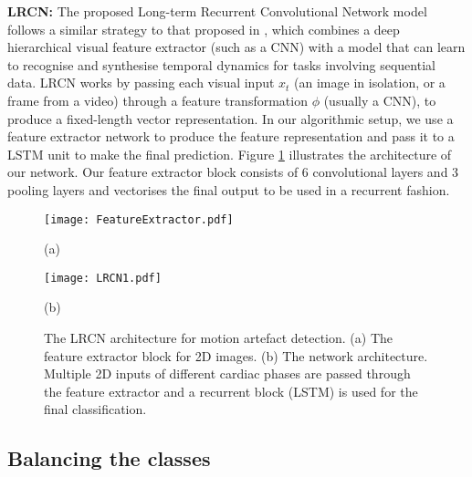 \documentclass[preprint,12pt,authoryear]{elsarticle}
\begin{document}
\textbf{LRCN:} The proposed Long-term  Recurrent  Convolutional Network model follows a similar strategy to that proposed in \cite{Donahue2017}, which combines a deep hierarchical visual feature extractor (such as a CNN) with a model that can learn  to  recognise  and  synthesise  temporal  dynamics  for tasks involving sequential data. LRCN works by passing each  visual  input $x_{t}$ (an  image  in  isolation,  or  a  frame  from  a  video)  through a feature transformation $\phi$ (usually a CNN), to produce a fixed-length vector representation. In our algorithmic setup, we use a feature extractor network to produce the feature representation and pass it to a LSTM unit to make the final prediction. Figure \ref{fig:ModelLRCN}  illustrates the architecture of our network. Our feature extractor block consists of  6 convolutional layers and 3 pooling layers and vectorises the final output to be used in a recurrent fashion.


 
 \begin{figure}[tb]

\begin{minipage}[b]{0.48\linewidth}
  \centering
  \centerline{\texttt{[image: FeatureExtractor.pdf]}}
  \centerline{(a)}\medskip
\end{minipage}
\hfill
\begin{minipage}[b]{0.48\linewidth}
  \centering
  \centerline{\texttt{[image: LRCN1.pdf]}}
  \centerline{(b)}\medskip
\end{minipage}
%
\hfill


\caption{ The LRCN architecture for motion artefact detection. (a) The  feature extractor block for 2D images. (b) The network architecture. Multiple 2D inputs of different cardiac phases are passed through the feature extractor and a recurrent block (LSTM) is used for the final classification.}
\label{fig:ModelLRCN}
%
\end{figure}


\subsection{Balancing the classes}
\label{sec:balance}
\end{document}
